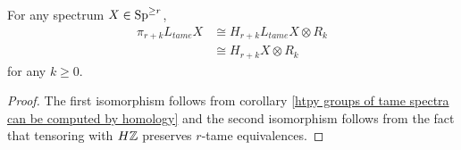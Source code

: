 \begin{corollary}
\label{homotopy groups of tame spectra are hmlg with coeff in tame ring system}
		For any spectrum $X\in \operatorname{Sp}^{\geq r}$, 
\begin{align*}
	\pi_{r+k} L_{tame}X & \cong H_{r+k} L_{tame}X \otimes R_{k}\\
		& \cong H_{r+k} X \otimes R_{k}
\end{align*}
for any $k\geq 0$.

\end{corollary}
\begin{proof}
	The first isomorphism follows from corollary \ref{htpy groups of tame spectra can be computed by homology} and the second isomorphism follows from the fact that tensoring with $H{\mathbb{Z}}$ preserves $r$-tame equivalences.
	
\end{proof}

